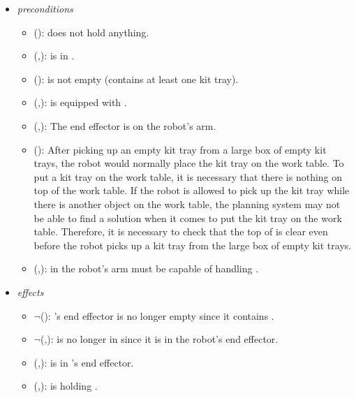 \begin{enumerate}
\begin{itemize}
 \item \textit{preconditions}
 \begin{itemize}
 \item {}():  does not hold anything.
 \item {}(,):  is in .
 \item {}():  is not empty (contains at least one kit tray).
 \item {}(,):  is equipped with .
 \item {}(,): The end effector is on the robot's arm.
 \item {}(): After picking up an empty kit tray from a large box of empty kit trays, the robot would normally place the kit tray on the work table. To put a kit tray on the work table, it is necessary that there is nothing on top of the work table. If the robot is allowed to pick up the kit tray while there is another object on the work table, the planning system may not be able to find a solution when it comes to put the kit tray on the work table. Therefore, it is necessary to check that the top of  is clear even before the robot picks up a kit tray from the large box of empty kit trays.
 \item {}(,):  in the robot's arm must be capable of handling .
 \end{itemize}
\item \textit{effects}
 \begin{itemize}
 \item $\neg$(): 's end effector is no longer empty since it contains .
 \item $\neg$(,):  is no longer in  since it is in the robot's end effector.
 \item {}(,):  is in 's end effector.
 \item {}(,):  is holding .
 \end{itemize}


\end{itemize}
\end{enumerate}
